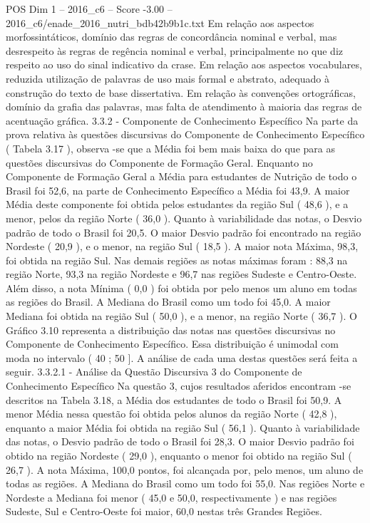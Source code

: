 \begin{textsample}{POS Dim 1 – 2016\_c6 – Score -3.00 – 2016\_c6/enade\_2016\_nutri\_bdb42b9b1c.txt}
Em relação aos aspectos morfossintáticos, domínio das regras de concordância nominal e verbal, mas desrespeito às regras de regência nominal e verbal, principalmente no que diz respeito ao uso do sinal indicativo da crase.
Em relação aos aspectos vocabulares, reduzida utilização de palavras de uso mais formal e abstrato, adequado à construção do texto de base dissertativa.
Em relação às convenções ortográficas, domínio da grafia das palavras, mas falta de atendimento à maioria das regras de acentuação gráfica. 3.3.2 - Componente de Conhecimento Específico Na parte da prova relativa às questões discursivas do Componente de Conhecimento Específico ( Tabela 3.17 ), observa -se que a Média foi bem mais baixa do que para as questões discursivas do Componente de Formação Geral.
Enquanto no Componente de Formação Geral a Média para estudantes de Nutrição de todo o Brasil foi 52,6, na parte de Conhecimento Específico a Média foi 43,9.
A maior Média deste componente foi obtida pelos estudantes da região Sul ( 48,6 ), e a menor, pelos da região Norte ( 36,0 ).
Quanto à variabilidade das notas, o Desvio padrão de todo o Brasil foi 20,5.
O maior Desvio padrão foi encontrado na região Nordeste ( 20,9 ), e o menor, na região Sul ( 18,5 ).
A maior nota Máxima, 98,3, foi obtida na região Sul.
Nas demais regiões as notas máximas foram : 88,3 na região Norte, 93,3 na região Nordeste e 96,7 nas regiões Sudeste e Centro-Oeste.
Além disso, a nota Mínima ( 0,0 ) foi obtida por pelo menos um aluno em todas as regiões do Brasil.
A Mediana do Brasil como um todo foi 45,0.
A maior Mediana foi obtida na região Sul ( 50,0 ), e a menor, na região Norte ( 36,7 ).
O Gráfico 3.10 representa a distribuição das notas nas questões discursivas no Componente de Conhecimento Específico.
Essa distribuição é unimodal com moda no intervalo ( 40 ; 50 ].
A análise de cada uma destas questões será feita a seguir. 3.3.2.1 - Análise da Questão Discursiva 3 do Componente de Conhecimento Específico Na questão 3, cujos resultados aferidos encontram -se descritos na Tabela 3.18, a Média dos estudantes de todo o Brasil foi 50,9.
A menor Média nessa questão foi obtida pelos alunos da região Norte ( 42,8 ), enquanto a maior Média foi obtida na região Sul ( 56,1 ).
Quanto à variabilidade das notas, o Desvio padrão de todo o Brasil foi 28,3.
O maior Desvio padrão foi obtido na região Nordeste ( 29,0 ), enquanto o menor foi obtido na região Sul ( 26,7 ).
A nota Máxima, 100,0 pontos, foi alcançada por, pelo menos, um aluno de todas as regiões.
A Mediana do Brasil como um todo foi 55,0.
Nas regiões Norte e Nordeste a Mediana foi menor ( 45,0 e 50,0, respectivamente ) e nas regiões Sudeste, Sul e Centro-Oeste foi maior, 60,0 nestas três Grandes Regiões.

\end{textsample}
